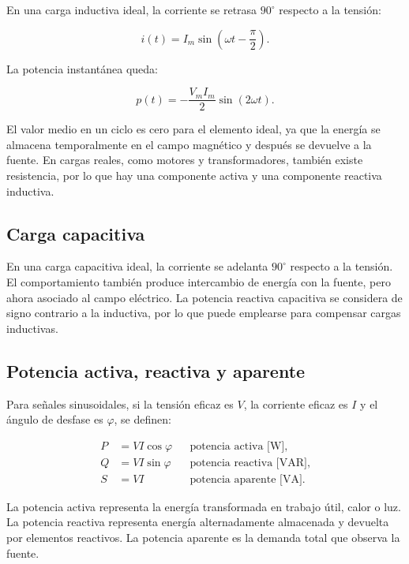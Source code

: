 	En una carga inductiva ideal, la corriente se retrasa \(90^{\circ}\) respecto a la tensión:
	
	\begin{equation}
		i(t)=I_m\sin\left(\omega t-\frac{\pi}{2}\right).
	\end{equation}
	
	La potencia instantánea queda:
	
	\begin{equation}
		p(t)=-\frac{V_mI_m}{2}\sin(2\omega t).
	\end{equation}
	
	El valor medio en un ciclo es cero para el elemento ideal, ya que la energía se almacena temporalmente en el campo magnético y después se devuelve a la fuente. En cargas reales, como motores y transformadores, también existe resistencia, por lo que hay una componente activa y una componente reactiva inductiva.
	
	\subsection{Carga capacitiva}
	
	En una carga capacitiva ideal, la corriente se adelanta \(90^{\circ}\) respecto a la tensión. El comportamiento también produce intercambio de energía con la fuente, pero ahora asociado al campo eléctrico. La potencia reactiva capacitiva se considera de signo contrario a la inductiva, por lo que puede emplearse para compensar cargas inductivas.
	
	\subsection{Potencia activa, reactiva y aparente}
	
	Para señales sinusoidales, si la tensión eficaz es \(V\), la corriente eficaz es \(I\) y el ángulo de desfase es \(\varphi\), se definen:
	
	\begin{align}
		P &= VI\cos\varphi && \text{potencia activa [W]},\\
		Q &= VI\sin\varphi && \text{potencia reactiva [VAR]},\\
		S &= VI && \text{potencia aparente [VA]}.
	\end{align}
	
	La potencia activa representa la energía transformada en trabajo útil, calor o luz. La potencia reactiva representa energía alternadamente almacenada y devuelta por elementos reactivos. La potencia aparente es la demanda total que observa la fuente.
	
